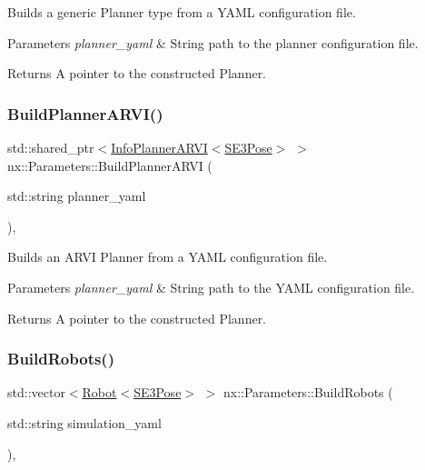 Builds a generic Planner type from a Y\+A\+ML configuration file. 
\begin{DoxyParams}{Parameters}
{\em planner\+\_\+yaml} & String path to the planner configuration file. \\
\hline
\end{DoxyParams}
\begin{DoxyReturn}{Returns}
A pointer to the constructed Planner. 
\end{DoxyReturn}
\mbox{\label{classnx_1_1Parameters_a1067b6207de6e2c4fe799c302bcd731b}} 
\subsubsection{\texorpdfstring{Build\+Planner\+A\+R\+V\+I()}{BuildPlannerARVI()}}
{\footnotesize\ttfamily std\+::shared\+\_\+ptr$<$\hyperlink{classnx_1_1InfoPlannerARVI}{Info\+Planner\+A\+R\+VI}$<$\hyperlink{structnx_1_1SE3Pose}{S\+E3\+Pose}$>$ $>$ nx\+::\+Parameters\+::\+Build\+Planner\+A\+R\+VI (\begin{DoxyParamCaption}\item[{std\+::string}]{planner\+\_\+yaml }\end{DoxyParamCaption})\hspace{0.3cm}{\ttfamily [inline]}, {\ttfamily [protected]}}

Builds an A\+R\+VI Planner from a Y\+A\+ML configuration file. 
\begin{DoxyParams}{Parameters}
{\em planner\+\_\+yaml} & String path to the Y\+A\+ML configuration file. \\
\hline
\end{DoxyParams}
\begin{DoxyReturn}{Returns}
A pointer to the constructed Planner. 
\end{DoxyReturn}
\mbox{\label{classnx_1_1Parameters_acc2af751ddee5fced21fe0f2d0a25023}} 
\subsubsection{\texorpdfstring{Build\+Robots()}{BuildRobots()}}
{\footnotesize\ttfamily std\+::vector$<$\hyperlink{classnx_1_1Robot}{Robot}$<$\hyperlink{structnx_1_1SE3Pose}{S\+E3\+Pose}$>$ $>$ nx\+::\+Parameters\+::\+Build\+Robots (\begin{DoxyParamCaption}\item[{std\+::string}]{simulation\+\_\+yaml }\end{DoxyParamCaption})\hspace{0.3cm}{\ttfamily [inline]}, {\ttfamily [protected]}}

